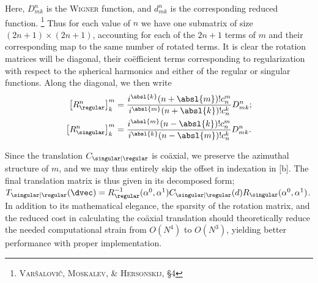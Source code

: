 \noindent
Here, $D^n_{mk}$ is the \textsc{Wigner} function, and $d^n_{mk}$ is the corresponding reduced function.%
\footnote{%
  \cite{varsalovic1988quantum} \textsc{Varšalovič}, \textsc{Moskalev}, \& \textsc{Hersonskij}, \S4
}
Thus for each value of $n$ we have one submatrix of size $(2n+1) \times (2n+1)$, accounting for each of the $2n+1$ terms of $m$ and their corresponding map to the same number of rotated terms.
It is clear the rotation matrices will be diagonal, their coëfficient terms corresponding to regularization with respect to the spherical harmonics and either of the regular or singular functions.
Along the diagonal, we then write
%
\begin{subequations}
  \begin{align}
    {\big[ R_{\regular}^n \big]}_{k}^{m} &= \frac{i^{\absl{k}}(n+\absl{m})! c_n^m}{i^{\absl{m}}(n+\absl{k})! c_n^k} D^n_{mk};\\
    {\big[ R_{\singular}^n \big]}_{k}^{m} &= \frac{i^{\absl{m}}(n-\absl{k})! c_n^m}{i^{\absl{k}}(n-\absl{m})! c_n^k} D^n_{mk}.
  \end{align}
\end{subequations}

\noindent
Since the translation $C_{\singular\vert\regular}$ is coäxial, we preserve the azimuthal structure of $m$, and we may thus entirely skip the offset in indexation in \subeqref{\ref{eq:translation_notation}}[b].
The final translation matrix is thus given in its decomposed form; $T_{\singular\vert\regular}(\dvec) = R_{\regular}^{-1}(\alpha^0, \alpha^1) C_{\singular\vert\regular}(d) R_{\singular}(\alpha^0, \alpha^1)$.
In addition to its mathematical elegance, the sparsity of the rotation matrix, and the reduced cost in calculating the coäxial translation should theoretically reduce the needed computational strain from $O(N^4)$ to $O(N^3)$, yielding better performance with proper implementation.
